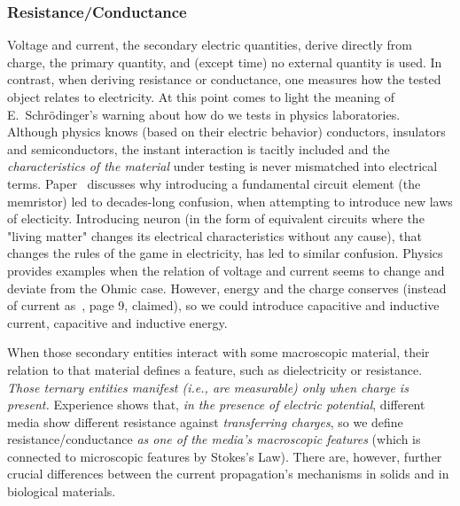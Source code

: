 \subsubsection[Resistance/Conductance]{Resistance/Conductance\label{sec:PHYSICS_RESISTANCECONDUCTANCE}}


Voltage and current, the secondary electric quantities, derive directly from charge, the primary quantity, and (except time) no external quantity is used. In contrast, when deriving resistance or conductance, one measures how the tested object relates to electricity. At this point comes to light the meaning of E.~Schrödinger's warning about how do we tests in
physics laboratories. Although physics knows (based on their 
electric behavior) conductors, insulators and semiconductors, the instant interaction is tacitly included and
the \textit{characteristics of the material} under testing 
is never mismatched into electrical terms. Paper~\cite{RejectingMemristor:2018} discusses why introducing
a fundamental circuit element (the memristor) led to decades-long confusion, when attempting to introduce new laws of electicity.
Introducing neuron (in the form of equivalent circuits where 
the "living matter" changes its electrical characteristics
without any cause), that changes the rules of the game in 
electricity, has led to similar confusion. 
Physics provides examples when the relation of voltage and current seems to change
and deviate from the Ohmic case.
However, energy and the charge conserves (instead of current as~\cite{KochBiophysics:1999}, page 9, claimed), so we could introduce 
capacitive and inductive current, capacitive and inductive energy.



When those secondary entities
interact with some macroscopic material, their relation to that material
defines a feature, such as dielectricity or resistance. \textit{Those
ternary entities manifest (i.e., are measurable) only when charge
is present.} Experience shows that, \textit{in the presence of electric
potential}, different media show different resistance against \textit{transferring
charges}, so we define resistance/conductance \textit{as one of the
media's macroscopic features} (which is connected to microscopic features
by Stokes's Law). There are, however, further crucial differences between the current propagation's mechanisms in solids and in biological materials. 



